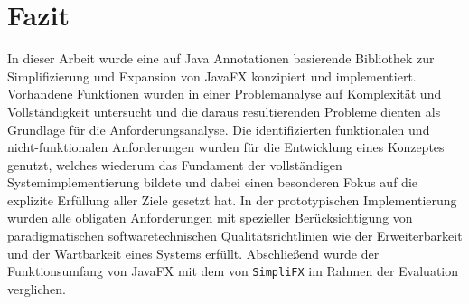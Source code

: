 \chapter{Fazit}
\label{fazit}
In dieser Arbeit wurde eine auf Java Annotationen basierende Bibliothek zur Simplifizierung und Expansion von JavaFX konzipiert und implementiert. Vorhandene Funktionen wurden in einer Problemanalyse auf Komplexität und Vollständigkeit untersucht und die daraus resultierenden Probleme dienten als Grundlage für die Anforderungsanalyse. Die identifizierten funktionalen und nicht-funktionalen Anforderungen wurden für die Entwicklung eines Konzeptes genutzt, welches wiederum das Fundament der vollständigen Systemimplementierung bildete und dabei einen besonderen Fokus auf die explizite Erfüllung aller Ziele gesetzt hat. In der prototypischen Implementierung wurden alle obligaten Anforderungen mit spezieller Berücksichtigung von paradigmatischen softwaretechnischen Qualitätsrichtlinien wie der Erweiterbarkeit und der Wartbarkeit eines Systems erfüllt. Abschließend wurde der Funktionsumfang von JavaFX mit dem von \texttt{SimpliFX} im Rahmen der Evaluation verglichen. 

